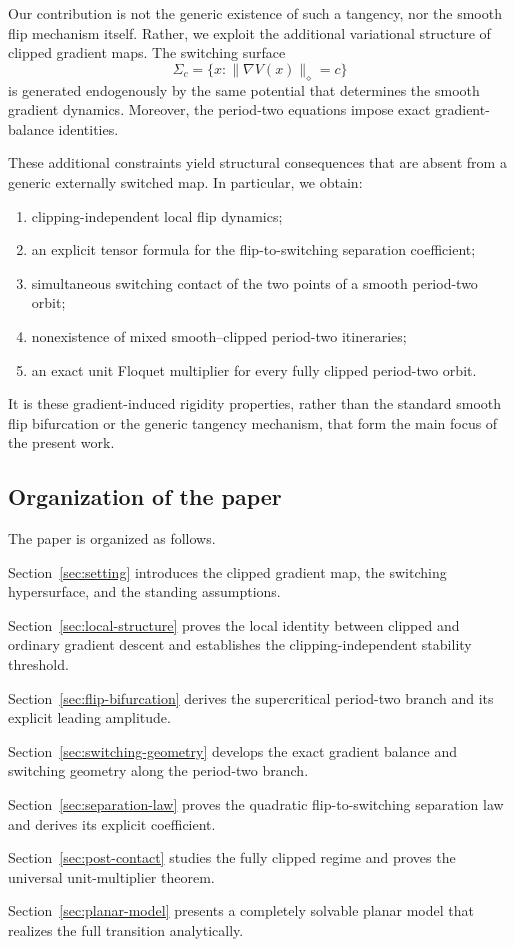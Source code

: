 Our contribution is not the generic existence of such a tangency,
nor the smooth flip mechanism itself. Rather, we exploit the
additional variational structure of clipped gradient maps.
The switching surface
\[
\Sigma_c=\{x:\|\nabla V(x)\|_\diamond=c\}
\]
is generated endogenously by the same potential that determines
the smooth gradient dynamics. Moreover, the period-two equations
impose exact gradient-balance identities.

These additional constraints yield structural consequences that
are absent from a generic externally switched map. In particular,
we obtain:
\begin{enumerate}
    \item clipping-independent local flip dynamics;
    \item an explicit tensor formula for the flip-to-switching
    separation coefficient;
    \item simultaneous switching contact of the two points of a
    smooth period-two orbit;
    \item nonexistence of mixed smooth--clipped period-two
    itineraries;
    \item an exact unit Floquet multiplier for every fully clipped
    period-two orbit.
\end{enumerate}

It is these gradient-induced rigidity properties, rather than the
standard smooth flip bifurcation or the generic tangency mechanism,
that form the main focus of the present work.
\subsection{Organization of the paper}
\label{subsec:intro-organization}

The paper is organized as follows.

Section~\ref{sec:setting} introduces the clipped gradient map,
the switching hypersurface, and the standing assumptions.

Section~\ref{sec:local-structure} proves the local identity between
clipped and ordinary gradient descent and establishes the
clipping-independent stability threshold.

Section~\ref{sec:flip-bifurcation} derives the supercritical
period-two branch and its explicit leading amplitude.

Section~\ref{sec:switching-geometry} develops the exact gradient
balance and switching geometry along the period-two branch.

Section~\ref{sec:separation-law} proves the quadratic
flip-to-switching separation law and derives its explicit coefficient.

Section~\ref{sec:post-contact} studies the fully clipped regime and
proves the universal unit-multiplier theorem.

Section~\ref{sec:planar-model} presents a completely solvable planar
model that realizes the full transition analytically.
